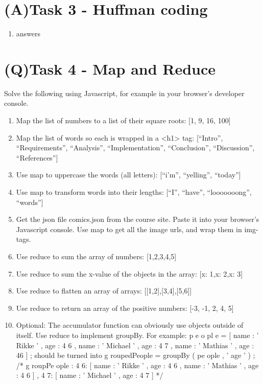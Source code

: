 \documentclass[a4paper,12pt]{article}
\begin{document}
\section{(A)Task 3 - Huffman coding}

\begin{enumerate}
\item answers
\end{enumerate}

\clearpage

\section{(Q)Task 4 - Map and Reduce}
Solve the following using Javascript, for example in your browser’s developer console.\\
\begin{enumerate}
\item Map the list of numbers to a list of their square roots: [1, 9, 16, 100]
\item Map the list of words so each is wrapped in a <h1> tag: [“Intro”, “Requirements”, “Analysis”, “Implementation”, “Conclusion”, “Discussion”,
“References”]
\item Use map to uppercase the words (all letters): [“i’m”, “yelling”, “today”]
\item Use map to transform words into their lengths: [“I”, “have”, “looooooong”,
“words”]
\item Get the json file comics.json from the course site. Paste it into your
browser’s Javascript console. Use map to get all the image urls, and wrap
them in img-tags.
\item Use reduce to sum the array of numbers: [1,2,3,4,5]
\item Use reduce to sum the x-value of the objects in the array: [{x: 1},{x:
2},{x: 3}]
\item Use reduce to flatten an array of arrays: [[1,2],[3,4],[5,6]]
\item Use reduce to return an array of the positive numbers: [-3, -1, 2, 4, 5]
\item Optional: The accumulator function can obviously use objects outside of
itself. Use reduce to implement groupBy. For example:
p e o pl e = [
{name : ’ Rikke ’ , age : 4 6} ,
{name : ’ Michael ’ , age : 4 7} ,
{name : ’ Mathias ’ , age : 46}
] ;
should be turned into
g roupedPeople = groupBy ( pe ople , ’ age ’ ) ;
/*
g roupPe ople :
{
4 6: [
{name : ’ Rikke ’ , age : 4 6 } ,
{name : ’ Mathias ’ , age : 4 6 }
] ,
4 7: [
{name : ’ Michael ’ , age : 4 7 }
]
}
*/

\end{enumerate}
\end{document}
